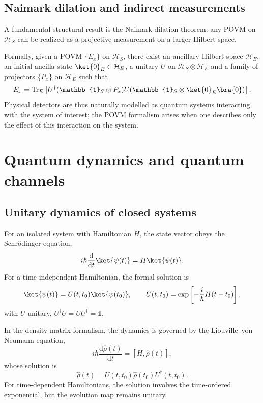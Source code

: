 \subsection{Naimark dilation and indirect measurements}

A fundamental structural result is the Naimark dilation theorem: any POVM on $\mathcal{H}_S$ can be realized as a projective measurement on a larger Hilbert space.

Formally, given a POVM $\{E_x\}$ on $\mathcal{H}_S$, there exist an ancillary Hilbert space $\mathcal{H}_E$, an initial ancilla state $\ket{0}_E \in \mathcal{H}_E$, a unitary $U$ on $\mathcal{H}_S \otimes \mathcal{H}_E$ and a family of projectors $\{P_x\}$ on $\mathcal{H}_E$ such that
\begin{equation}
	E_x =
	\operatorname{Tr}_E \left[
	U^\dagger (\mathbb{1}_S \otimes P_x) U
	(\mathbb{1}_S \otimes \ket{0}_E\bra{0})
	\right].
\end{equation}
Physical detectors are thus naturally modelled as quantum systems interacting with the system of interest; the POVM formalism arises when one describes only the effect of this interaction on the system.

\section{Quantum dynamics and quantum channels}
\label{sec:channels}

\subsection{Unitary dynamics of closed systems}

For an isolated system with Hamiltonian $H$, the state vector obeys the Schrödinger equation,
\begin{equation}
	i \hbar \frac{\mathrm{d}}{\mathrm{d}t} \ket{\psi(t)} = H \ket{\psi(t)}.
\end{equation}
For a time-independent Hamiltonian, the formal solution is
\begin{equation}
	\ket{\psi(t)} = U(t,t_0)\ket{\psi(t_0)},
	\qquad
	U(t,t_0) = \exp\left[-\frac{i}{\hbar} H (t-t_0)\right],
\end{equation}
with $U$ unitary, $U^\dagger U = UU^\dagger = \mathbb{1}$.

In the density matrix formalism, the dynamics is governed by the Liouville--von Neumann equation,
\begin{equation}
	i \hbar \frac{\mathrm{d}\hat{\rho}(t)}{\mathrm{d}t} = [H,\hat{\rho}(t)],
\end{equation}
whose solution is
\begin{equation}
	\hat{\rho}(t) = U(t,t_0) \hat{\rho}(t_0) U^\dagger(t,t_0).
\end{equation}
For time-dependent Hamiltonians, the solution involves the time-ordered exponential, but the evolution map remains unitary.

